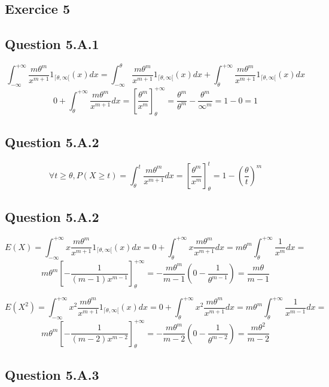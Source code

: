 \documentclass[]{book}
\theoremstyle{definition}
\begin{document}
\subsection*{Exercice 5}
\subsection*{Question 5.A.1}

$$
\int_{-\infty}^{+\infty}{\frac{m \theta^m}{x^{m+1}}1_{\lceil \theta, \infty[}(x) dx} = 
\int_{-\infty}^{\theta}{\frac{m \theta^m}{x^{m+1}}1_{\lceil \theta, \infty[}(x) dx} + \int_{\theta}^{+\infty}{\frac{m \theta^m}{x^{m+1}}1_{\lceil \theta, \infty[}(x) dx}
$$
$$
0 + \int_{\theta}^{+\infty}{\frac{m \theta^m}{x^{m+1}} dx} =
\left[\frac{\theta^m}{x^m}\right]_{\theta}^{+\infty} =
\frac{\theta^m}{\theta^m} - \frac{\theta^m}{\infty^m} = 1 - 0 = 1
$$

\subsection*{Question 5.A.2}
$$
\forall t \geq \theta, P(X \geq t) = \int_{\theta}^{t}{\frac{m \theta^m}{x^{m+1}} dx} = 
\left[\frac{\theta^m}{x^m}\right]_{\theta}^{t} =
1 - \left( \frac{\theta}{t}\right)^m
$$


\subsection*{Question 5.A.2}
$$
E(X) = \int_{-\infty}^{+\infty}{x \frac{m \theta^m}{x^{m+1}}1_{\lceil \theta, \infty[}(x) dx} =
0 + \int_{\theta}^{+\infty}{x\frac{m \theta^m}{x^{m+1}} dx} =
m \theta^m \int_{\theta}^{+\infty}{\frac{1}{x^{m}} dx} = 
$$
$$
m \theta^m \left[-\frac{1}{(m-1)x^{m-1}}\right]_{\theta}^{+\infty} = 
-\frac{m \theta^m}{m-1} \left(0 - \frac{1}{\theta^{m-1}}\right) =
\frac{m \theta}{m-1}
$$

\bigskip

$$
E(X^2) = \int_{-\infty}^{+\infty}{x^2 \frac{m \theta^m}{x^{m+1}}1_{\lceil \theta, \infty[}(x) dx} =
0 + \int_{\theta}^{+\infty}{x^2\frac{m \theta^m}{x^{m+1}} dx} =
m \theta^m \int_{\theta}^{+\infty}{\frac{1}{x^{m-1}} dx} = 
$$
$$
m \theta^m \left[-\frac{1}{(m-2)x^{m-2}}\right]_{\theta}^{+\infty} = 
-\frac{m \theta^m}{m-2} \left(0 - \frac{1}{\theta^{m-2}}\right) =
\frac{m \theta^2}{m-2}
$$

\subsection*{Question 5.A.3}
\end{document}
